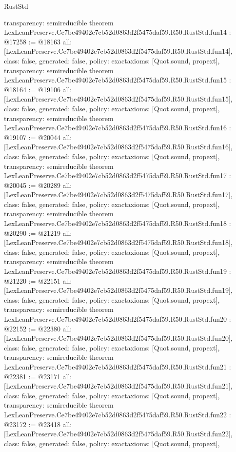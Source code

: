 \begin{lexlean}{RustStd}
\begin{coremodule}
{  transparency: semireducible
}
theorem LexLeanPreserve.Ce7be49402e7cb52d0863d2f5475daf59.R50.RustStd.fun14 : @17258 := @18163 {
  all: [LexLeanPreserve.Ce7be49402e7cb52d0863d2f5475daf59.R50.RustStd.fun14],
  class: false,
  generated: false,
  policy: exact{axioms: [Quot.sound, propext]},
  transparency: semireducible
}
theorem LexLeanPreserve.Ce7be49402e7cb52d0863d2f5475daf59.R50.RustStd.fun15 : @18164 := @19106 {
  all: [LexLeanPreserve.Ce7be49402e7cb52d0863d2f5475daf59.R50.RustStd.fun15],
  class: false,
  generated: false,
  policy: exact{axioms: [Quot.sound, propext]},
  transparency: semireducible
}
theorem LexLeanPreserve.Ce7be49402e7cb52d0863d2f5475daf59.R50.RustStd.fun16 : @19107 := @20044 {
  all: [LexLeanPreserve.Ce7be49402e7cb52d0863d2f5475daf59.R50.RustStd.fun16],
  class: false,
  generated: false,
  policy: exact{axioms: [Quot.sound, propext]},
  transparency: semireducible
}
theorem LexLeanPreserve.Ce7be49402e7cb52d0863d2f5475daf59.R50.RustStd.fun17 : @20045 := @20289 {
  all: [LexLeanPreserve.Ce7be49402e7cb52d0863d2f5475daf59.R50.RustStd.fun17],
  class: false,
  generated: false,
  policy: exact{axioms: [Quot.sound, propext]},
  transparency: semireducible
}
theorem LexLeanPreserve.Ce7be49402e7cb52d0863d2f5475daf59.R50.RustStd.fun18 : @20290 := @21219 {
  all: [LexLeanPreserve.Ce7be49402e7cb52d0863d2f5475daf59.R50.RustStd.fun18],
  class: false,
  generated: false,
  policy: exact{axioms: [Quot.sound, propext]},
  transparency: semireducible
}
theorem LexLeanPreserve.Ce7be49402e7cb52d0863d2f5475daf59.R50.RustStd.fun19 : @21220 := @22151 {
  all: [LexLeanPreserve.Ce7be49402e7cb52d0863d2f5475daf59.R50.RustStd.fun19],
  class: false,
  generated: false,
  policy: exact{axioms: [Quot.sound, propext]},
  transparency: semireducible
}
theorem LexLeanPreserve.Ce7be49402e7cb52d0863d2f5475daf59.R50.RustStd.fun20 : @22152 := @22380 {
  all: [LexLeanPreserve.Ce7be49402e7cb52d0863d2f5475daf59.R50.RustStd.fun20],
  class: false,
  generated: false,
  policy: exact{axioms: [Quot.sound, propext]},
  transparency: semireducible
}
theorem LexLeanPreserve.Ce7be49402e7cb52d0863d2f5475daf59.R50.RustStd.fun21 : @22381 := @23171 {
  all: [LexLeanPreserve.Ce7be49402e7cb52d0863d2f5475daf59.R50.RustStd.fun21],
  class: false,
  generated: false,
  policy: exact{axioms: [Quot.sound, propext]},
  transparency: semireducible
}
theorem LexLeanPreserve.Ce7be49402e7cb52d0863d2f5475daf59.R50.RustStd.fun22 : @23172 := @23418 {
  all: [LexLeanPreserve.Ce7be49402e7cb52d0863d2f5475daf59.R50.RustStd.fun22],
  class: false,
  generated: false,
  policy: exact{axioms: [Quot.sound, propext]},
}
\end{coremodule}
\end{lexlean}
